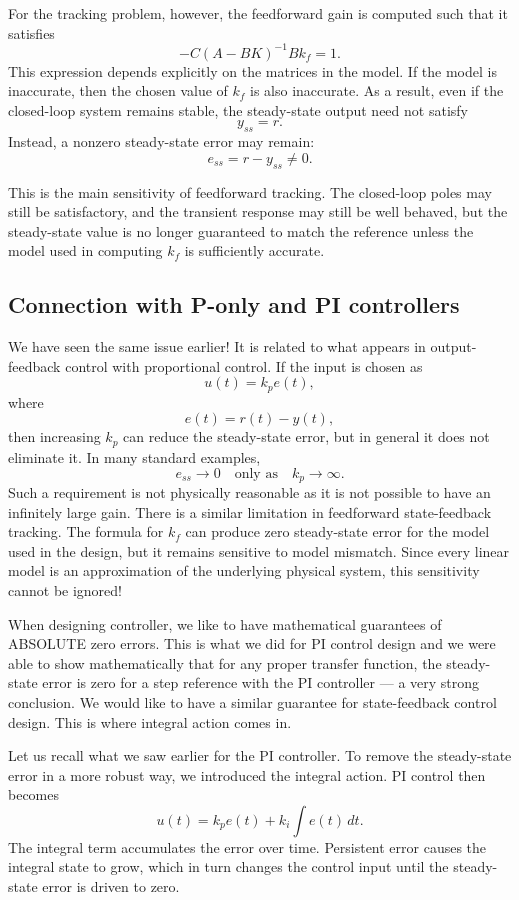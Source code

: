 \documentclass{ee122_notes}
\begin{document}
For the tracking problem, however, the feedforward gain is computed such that it satisfies
\[
-C(A-BK)^{-1}Bk_f = 1.
\]
This expression depends explicitly on the matrices in the model. If the model is inaccurate, then the chosen value of \(k_f\) is also inaccurate. As a result, even if the closed-loop system remains stable, the steady-state output need not satisfy
\[
y_{ss}=r.
\]
Instead, a nonzero steady-state error may remain:
\[
e_{ss}=r-y_{ss}\neq 0.
\]

This is the main sensitivity of feedforward tracking. The closed-loop poles may still be satisfactory, and the transient response may still be well behaved, but the steady-state value is no longer guaranteed to match the reference unless the model used in computing \(k_f\) is sufficiently accurate.

\subsection{Connection with P-only and PI controllers}

We have seen the same issue earlier! It is related to what appears in output-feedback control with proportional control. If the input is chosen as
\[
u(t)=k_p e(t),
\]
where
\[
e(t)=r(t)-y(t),
\]
then increasing \(k_p\) can reduce the steady-state error, but in general it does not eliminate it. In many standard examples,
\[
e_{ss}\to 0
\quad \text{only as} \quad
k_p\to\infty.
\]
Such a requirement is not physically reasonable as it is not possible to have an infinitely large gain. There is a similar limitation in feedforward state-feedback tracking. The formula for \(k_f\) can produce zero steady-state error for the model used in the design, but it remains sensitive to model mismatch. Since every linear model is an approximation of the underlying physical system, this sensitivity cannot be ignored! 

When designing controller, we like to have mathematical guarantees of ABSOLUTE zero errors. This is what we did for PI control design and we were able to show mathematically that for any proper transfer function, the steady-state error is zero for a step reference with the PI controller --- a very strong conclusion. We would like to have a similar guarantee for state-feedback control design. This is where integral action comes in.

Let us recall what we saw earlier for the PI controller. To remove the steady-state error in a more robust way, we introduced the integral action. PI control then becomes
\[
u(t)=k_p e(t)+k_i\int e(t)\,dt.
\]
The integral term accumulates the error over time. Persistent error causes the integral state to grow, which in turn changes the control input until the steady-state error is driven to zero.
\end{document}
